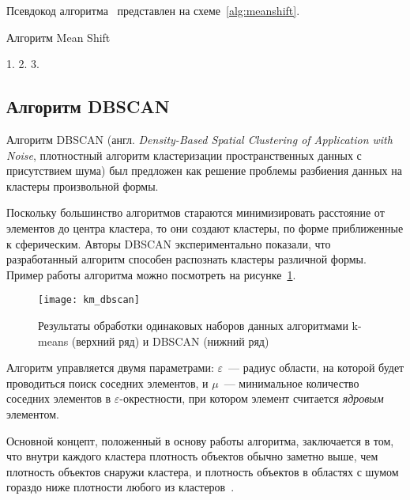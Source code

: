 Псевдокод алгоритма~\cite[с. 235-236]{algms} представлен на схеме~\ref{alg:meanshift}.
\begin{algorithm}[ht!]
    \caption{Алгоритм Mean Shift}
    1. 
    2. 
    3. 
    \label{alg:meanshift}
\end{algorithm}

\subsection{Алгоритм DBSCAN}
Алгоритм DBSCAN (англ. \emph{Density-Based Spatial Clustering of Application with Noise}, плотностный алгоритм кластеризации пространственных данных с присутствием шума) был предложен как решение проблемы разбиения данных на кластеры произвольной формы.

Поскольку большинство алгоритмов стараются минимизировать расстояние от элементов до центра кластера, то они создают кластеры, по форме приближенные к сферическим. Авторы DBSCAN экспериментально показали, что разработанный алгоритм способен распознать кластеры различной формы. Пример работы алгоритма можно посмотреть на рисунке~\ref{pic:km-dbscan}.

\begin{figure}[tb!]
    \centering
    \texttt{[image: km\_dbscan]}\\[1ex]
    \parbox{.9\textwidth}{\caption{Результаты обработки одинаковых наборов данных алгоритмами k-means (верхний ряд) и DBSCAN (нижний ряд)} \label{pic:km-dbscan}}
\end{figure}

Алгоритм управляется двумя параметрами: \( \varepsilon \)~--- радиус области, на которой будет проводиться поиск соседних элементов, и \( \mu \)~--- минимальное количество соседних элементов в \( \varepsilon \)-окрестности, при котором элемент считается \emph{ядровым} элементом.

Основной концепт, положенный в основу работы алгоритма, заключается в том, что внутри каждого кластера плотность объектов обычно заметно выше, чем плотность объектов снаружи кластера, и плотность объектов в областях с шумом гораздо ниже плотности любого из кластеров~\cite{dbscan-pos}.

